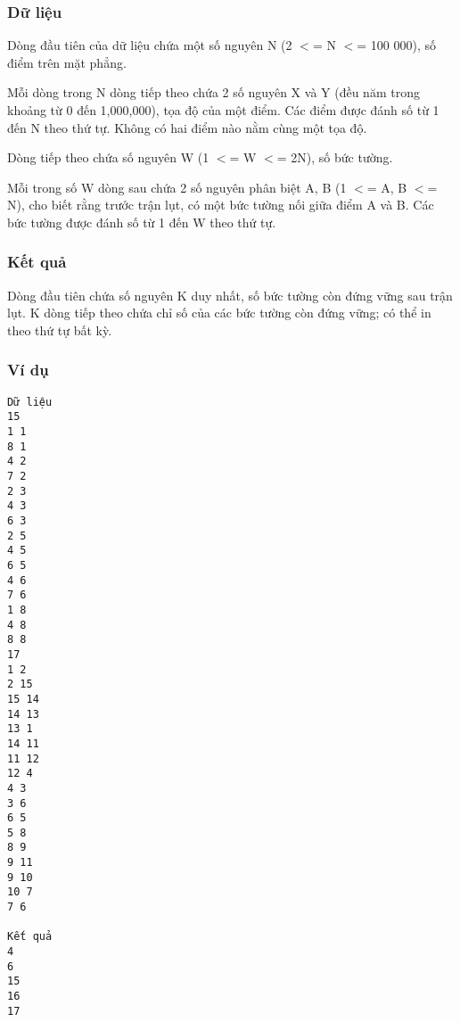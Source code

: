 \subsubsection{   Dữ liệu  }

   Dòng đầu tiên của dữ liệu chứa một số nguyên N (2 $<$= N $<$= 100 000), số điểm trên mặt phẳng.  

   Mỗi dòng trong N dòng tiếp theo chứa 2 số nguyên X và Y (đều năm trong khoảng từ 0 đến 1,000,000), tọa độ của một điểm. Các điểm được đánh số từ 1 đến N theo thứ tự. Không có hai điểm nào nằm cùng một tọa độ.  

   Dòng tiếp theo chứa số nguyên W (1 $<$= W $<$= 2N), số bức tường.  

   Mỗi trong số W dòng sau chứa 2 số nguyên phân biệt A, B (1 $<$= A, B $<$= N), cho biết rằng trước trận lụt, có một bức tường nối giữa điểm A và B. Các bức tường được đánh số từ 1 đến W theo thứ tự.  

\subsubsection{   Kết quả  }

   Dòng đầu tiên chứa số nguyên K duy nhất, số bức tường còn đứng vững sau trận lụt. K dòng tiếp theo chứa chỉ số của các bức tường còn đứng vững; có thể in theo thứ tự bất kỳ.  

\subsubsection{   Ví dụ  }
\begin{verbatim}
Dữ liệu
15
1 1
8 1
4 2
7 2
2 3
4 3
6 3
2 5
4 5
6 5
4 6
7 6
1 8
4 8
8 8
17
1 2
2 15
15 14
14 13
13 1
14 11
11 12
12 4
4 3
3 6
6 5
5 8
8 9
9 11
9 10
10 7
7 6

Kết quả
4
6
15
16
17
\end{verbatim}